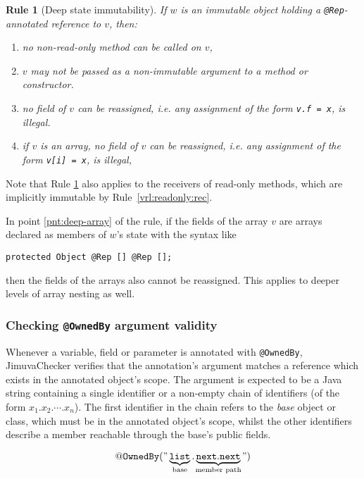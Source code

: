\documentclass{pracamgr}
\theoremstyle{break}
\theoremstyle{break}
\theoremstyle{break}
\newtheorem{verrule}{Rule}
\begin{document}
\begin{verrule}[Deep state immutability] \label{vrl:deepimm}
  If $w$ is an immutable object holding a \texttt{@Rep}-annotated
  reference to $v$, then:
  \begin{enumerate}[label=(\arabic*)]
  \item no non-read-only method can be called on $v$, 
  \item $v$ may not be passed as a non-immutable argument to a method
    or constructor.
  \item no field of $v$ can be reassigned, i.e. any assignment of the
    form \texttt{v.f~=~x}, is illegal.
  \item \label{pnt:deep-array} if $v$ is an array, no field of $v$ can
    be reassigned, i.e. any assignment of the form \texttt{v[i]~=~x},
    is illegal, 
  \end{enumerate}
\end{verrule}
Note that Rule \ref{vrl:deepimm} also applies to the receivers of
read-only methods, which are implicitly immutable by
Rule~\ref{vrl:readonly:rec}. 

In point \ref{pnt:deep-array} of the rule, if the fields of the
array $v$ are arrays declared as members of $w$'s state with the
syntax like
\begin{center}
  \texttt{protected Object @Rep [] @Rep [];}
\end{center}
then the fields of the arrays also cannot be reassigned. This applies
to deeper levels of array nesting as well. 

\subsubsection{Checking \texttt{@OwnedBy} argument validity} 

Whenever a variable, field or parameter is annotated with
\texttt{@OwnedBy}, JimuvaChecker verifies that the annotation's
argument matches a reference which exists in the annotated object's
scope. The argument is expected to be a Java string containing a
single identifier or a non-empty chain of identifiers (of the form
$x_1.x_2.\cdots.x_n$). The first identifier in the chain refers to the
\emph{base} object or class, which must be in the annotated object's
scope, whilst the other identifiers describe a member reachable
through the base's public fields.

$$ \mathtt{@OwnedBy("}\underbrace{\mathtt{list}}_{\mathclap{\textrm{base}}} 
\mathtt{.}
\underbrace{\mathtt{next.next}}_{\mathclap{\textrm{member path}}}\mathtt{")} $$
\end{document}
